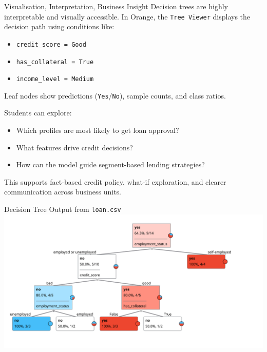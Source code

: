 \documentclass[aspectratio=169, table]{beamer}
\begin{document}
\begin{frame}{Visualisation, Interpretation, Business Insight}
	\vspace{10pt}
	Decision trees are highly interpretable and visually accessible. In Orange, the \texttt{Tree Viewer} displays the decision path using conditions like:
	\begin{itemize}
		\item \texttt{credit\_score = Good}
		\item \texttt{has\_collateral = True}
		\item \texttt{income\_level = Medium}
	\end{itemize}
	
	Leaf nodes show predictions (\texttt{Yes}/\texttt{No}), sample counts, and class ratios.
	
	Students can explore:
	\begin{itemize}
		\item Which profiles are most likely to get loan approval?
		\item What features drive credit decisions?
		\item How can the model guide segment-based lending strategies?
	\end{itemize}
	
	This supports fact-based credit policy, what-if exploration, and clearer communication across business units.
\end{frame}

\begin{frame}{Decision Tree Output from \texttt{loan.csv}}
	\vspace{20pt}
	\centering
	\includegraphics[width=.9\linewidth]{../../figures/loan_tree.png}
\end{frame}
\end{document}
